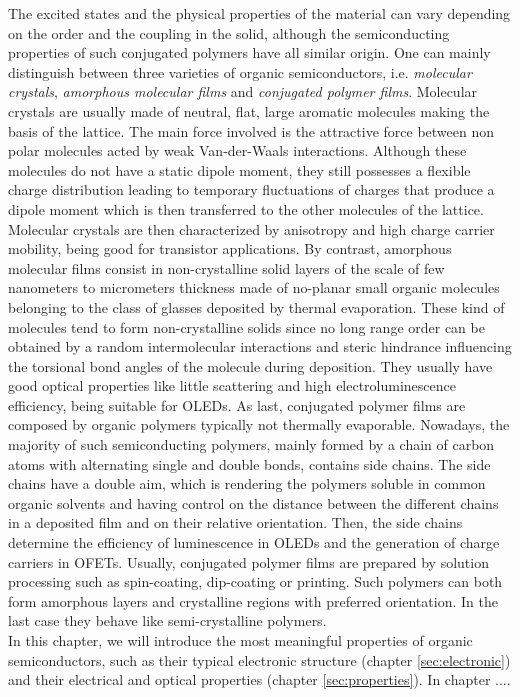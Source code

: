 \documentclass  [
  paper    = a4,
  BCOR     = 10mm,
  twoside,
  fontsize = 12pt,
  fleqn,
  toc      = bibnumbered,
  toc      = listofnumbered,
  numbers  = noendperiod,
  headings = normal,
  listof   = leveldown,
  version  = 3.03
]                                       {scrreprt}
\begin{document}
The excited states and the physical properties of the material can vary depending on the order and the coupling in the solid, although the semiconducting properties of such conjugated polymers have all similar origin. One can mainly distinguish between three varieties of organic semiconductors, i.e. \emph{molecular crystals}, \emph{amorphous molecular films} and \emph{conjugated polymer films}. Molecular crystals are usually made of neutral, flat, large aromatic molecules making the basis of the lattice. The main force involved is the attractive force between non polar molecules acted by weak Van-der-Waals interactions. Although these molecules do not have a static dipole moment, they still possesses a flexible charge distribution leading to temporary fluctuations of charges that produce a dipole moment which is then transferred to the other molecules of the lattice. Molecular crystals are then characterized by anisotropy and high charge carrier mobility, being good for transistor applications. By contrast, amorphous molecular films consist in non-crystalline solid layers of the scale of few nanometers to micrometers thickness made of no-planar small organic molecules belonging to the class of glasses deposited by thermal evaporation. These kind of molecules tend to form non-crystalline solids since no long range order can be obtained by a random intermolecular interactions and steric hindrance influencing the torsional bond angles of the molecule during deposition. They usually have good optical properties like little scattering and high electroluminescence efficiency, being suitable for OLEDs. As last, conjugated polymer films are composed by organic polymers typically not thermally evaporable. Nowadays, the majority of such semiconducting polymers, mainly formed by a chain of carbon atoms with alternating single and double bonds, contains side chains. The side chains have a double aim, which is rendering the polymers soluble in common organic solvents and having control on the distance between the different chains in a deposited film and on their relative orientation. Then, the side chains determine the efficiency of luminescence in OLEDs and the generation of charge carriers in OFETs. Usually, conjugated polymer films are prepared by solution processing such as spin-coating, dip-coating or printing. Such polymers can both form amorphous layers and crystalline regions with preferred orientation. In the last case they behave like semi-crystalline polymers.\\

In this chapter, we will introduce the most meaningful properties of organic semiconductors, such as their typical electronic structure (chapter \ref{sec:electronic}) and their electrical and optical properties (chapter \ref{sec:properties}). In chapter ....\\
\end{document}
